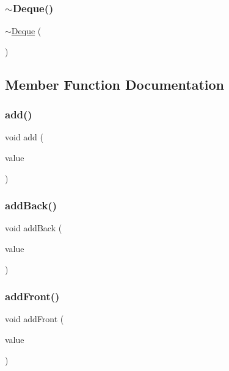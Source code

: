 \mbox{\label{classDeque_a9d75ae227f70523957cb9b60283d9390}} 
\subsubsection{\texorpdfstring{$\sim$\+Deque()}{~Deque()}}
{\footnotesize\ttfamily $\sim$\mbox{\hyperlink{classDeque}{Deque}} (\begin{DoxyParamCaption}{ }\end{DoxyParamCaption})\hspace{0.3cm}{\ttfamily [virtual]}}



\subsection{Member Function Documentation}
\mbox{\label{classDeque_ab901606bf3a8019c986f0cf9a9f298dc}} 
\subsubsection{\texorpdfstring{add()}{add()}}
{\footnotesize\ttfamily void add (\begin{DoxyParamCaption}\item[{const Value\+Type \&}]{value }\end{DoxyParamCaption})}

\mbox{\label{classDeque_a0c733f31bccadf80a6793490b115bd37}} 
\subsubsection{\texorpdfstring{add\+Back()}{addBack()}}
{\footnotesize\ttfamily void add\+Back (\begin{DoxyParamCaption}\item[{const Value\+Type \&}]{value }\end{DoxyParamCaption})}

\mbox{\label{classDeque_a1d5c5f74583e2a0fcd33f177ecbb9aa4}} 
\subsubsection{\texorpdfstring{add\+Front()}{addFront()}}
{\footnotesize\ttfamily void add\+Front (\begin{DoxyParamCaption}\item[{const Value\+Type \&}]{value }\end{DoxyParamCaption})}

